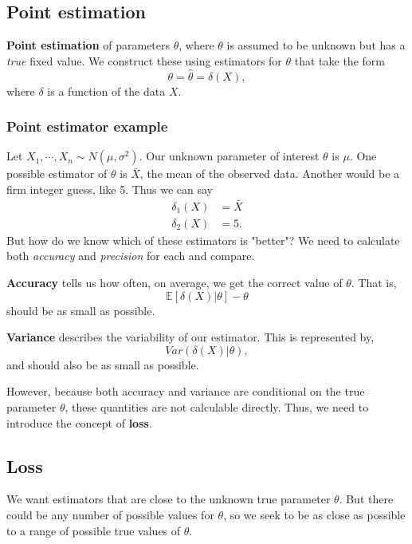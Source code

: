\documentclass[titlepage, 12pt, leqno]{article}
\begin{document}
\subsection{Point estimation}
\begin{definition}
    \textbf{Point estimation} of parameters $\theta$, where $\theta$ is assumed
    to be unknown but has a \textit{true} fixed value. We construct these using
    estimators for $\theta$ that take the form
    \[
    \theta = \hat \theta = \delta(X),
    \]
    where $\delta$ is a function of the data $X$.
\end{definition}

\subsubsection{Point estimator example}
Let $X_{1}, \cdots , X_{n} \sim N(\mu, \sigma^{2})$. Our unknown parameter of
interest $\theta$ is $\mu$. One possible estimator of $\theta$ is $\bar X$, the
mean of the observed data. Another would be a firm integer guess, like 5. Thus
we can say
\begin{align*}
    \delta_{1}(X) &= \bar X\\
    \delta_{2}(X) &= 5.
\end{align*}
But how do we know which of these estimators is "better"? We need to calculate
both \textit{accuracy} and \textit{precision} for each and compare.
\begin{definition}
    \textbf{Accuracy} tells us how often, on average, we get the correct value
    of $\theta$. That is,
    \[
        \mathbb{E}[\delta(X)|\theta] - \theta
    \]
    should be as small as possible.
\end{definition}

\begin{definition}
    \textbf{Variance} describes the variability of our estimator. This is
    represented by,
    \[
    Var(\delta(X)|\theta),
    \]
    and should also be as small as possible.
\end{definition}

However, because both accuracy and variance are conditional on the true
parameter $\theta$, these quantities are not calculable directly. Thus, we need
to introduce the concept of \textbf{loss}. 

\subsection{Loss}
We want estimators that are close to the unknown true parameter $\theta$. But
there could be any number of possible values for $\theta$, so we seek to be as
close as possible to a range of possible true values of $\theta$.
\end{document}

